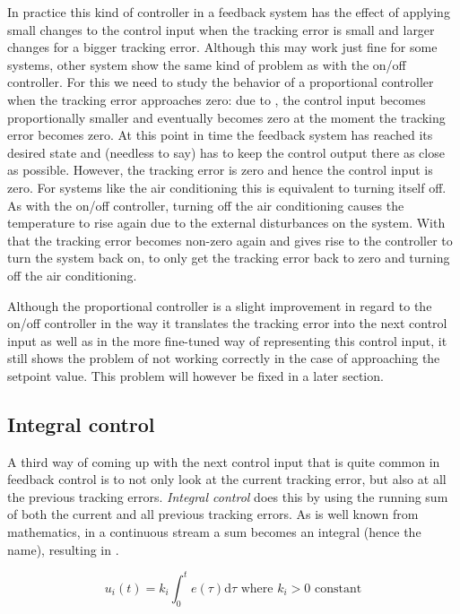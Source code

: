 In practice this kind of controller in a feedback system has the effect of applying small changes to the control input when the tracking error is small and larger changes for a bigger tracking error. Although this may work just fine for some systems, other system show the same kind of problem as with the on/off controller. For this we need to study the behavior of a proportional controller when the tracking error approaches zero: due to , the control input becomes proportionally smaller and eventually becomes zero at the moment the tracking error becomes zero. At this point in time the feedback system has reached its desired state and (needless to say) has to keep the control output there as close as possible. However, the tracking error is zero and hence the control input is zero. For systems like the air conditioning this is equivalent to turning itself off. As with the on/off controller, turning off the air conditioning causes the temperature to rise again due to the external disturbances on the system. With that the tracking error becomes non-zero again and gives rise to the controller to turn the system back on, to only get the tracking error back to zero and turning off the air conditioning.

Although the proportional controller is a slight improvement in regard to the on/off controller in the way it translates the tracking error into the next control input as well as in the more fine-tuned way of representing this control input, it still shows the problem of not working correctly in the case of approaching the setpoint value. This problem will however be fixed in a later section.

\subsection{Integral control}
A third way of coming up with the next control input that is quite common in feedback control is to not only look at the current tracking error, but also at all the previous tracking errors. \textit{Integral control} does this by using the running sum of both the current and all previous tracking errors. As is well known from mathematics, in a continuous stream a sum becomes an integral (hence the name), resulting in .

\begin{equation}\label{eq:integral-control-continuous}
u_i(t) = k_i \int_{0}^{t}e(\tau) \mathrm{d} \tau \text{\ \ \ \ where } k_i > 0 \text{ constant}
\end{equation}


